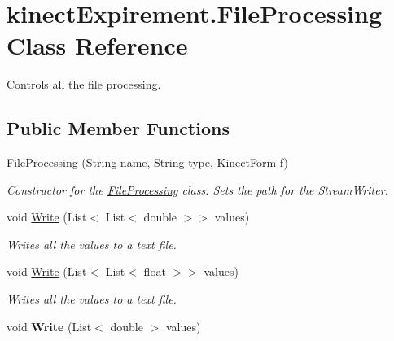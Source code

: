 \hypertarget{classkinect_expirement_1_1_file_processing}{}\section{kinect\+Expirement.\+File\+Processing Class Reference}
\label{classkinect_expirement_1_1_file_processing}


Controls all the file processing.  


\subsection*{Public Member Functions}
\begin{DoxyCompactItemize}
\item 
\hyperlink{classkinect_expirement_1_1_file_processing_a126bac9d4c2bfe361c835b0ed1b06ba0}{File\+Processing} (String name, String type, \hyperlink{classkinect_expirement_1_1_kinect_form}{Kinect\+Form} f)
\begin{DoxyCompactList}\small\item\em Constructor for the {\ttfamily \hyperlink{classkinect_expirement_1_1_file_processing}{File\+Processing}} class. Sets the path for the {\ttfamily Stream\+Writer}. \end{DoxyCompactList}\item 
void \hyperlink{classkinect_expirement_1_1_file_processing_ae8afb28ed378a0e2c5c84bcdd1ac022c}{Write} (List$<$ List$<$ double $>$$>$ values)
\begin{DoxyCompactList}\small\item\em Writes all the values to a text file. \end{DoxyCompactList}\item 
void \hyperlink{classkinect_expirement_1_1_file_processing_ab934081ab1dbf83efd6657a46b8c8bd2}{Write} (List$<$ List$<$ float $>$$>$ values)
\begin{DoxyCompactList}\small\item\em Writes all the values to a text file. \end{DoxyCompactList}\item 
void {\bfseries Write} (List$<$ double $>$ values)\hypertarget{classkinect_expirement_1_1_file_processing_ae55d0c73887aa70b0004ec83140b9974}{}\label{classkinect_expirement_1_1_file_processing_ae55d0c73887aa70b0004ec83140b9974}

\end{DoxyCompactItemize}


